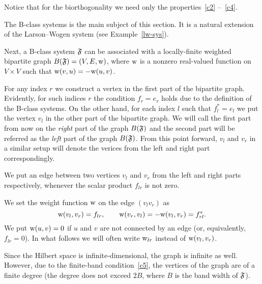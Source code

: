 \documentclass[12pt,oneside,a4paper]{amsart}
\begin{document}
    \begin{remark}
      Notice that for the biorthogonality we need only the properties~\ref{c2} --~\ref{c4}.
    \end{remark}
    The B-class systems is the main subject of this section.
    It is a natural extension of the Larson--Wogen system (see Example~\ref{lw-sys}).

    Next, a B-class system $\mathfrak{F}$ can be associated with a
      locally-finite weighted bipartite graph $B(\mathfrak{F}) = (V, E, \mathrm{w})$, where $\mathrm{w}$ is a
      nonzero real-valued function on $V\times V$ such that $\mathrm{w}(v, u) = -\mathrm{w}(u, v)$.

    For any index $r$ we construct a vertex in the first part of the bipartite graph.
    Evidently, for such indices $r$ the condition $f_r = e_r$ holds due to the definition of the B-class systems.
    On the other hand, for each index $l$ such that $f^*_l = e_l$ we put the vertex $v_l$ in the other part of the bipartite graph.
    We will call the first part from now on the \emph{right} part of the graph $B(\mathfrak{F})$ and the second part
      will be referred as the \emph{left} part of the graph $B(\mathfrak{F})$.
    From this point forward, $v_l$ and $v_r$ in a similar setup will denote the verices from the left and right part correspondingly.

    We put an edge between two vertices $v_l$ and $v_r$ from the left and right parts respectively,
      whenever the scalar product $f_{lr}$ is not zero.

    We set the weight function $\mathrm{w}$ on the edge $(v_l v_r)$ as
    \begin{equation}
      \label{def-wt}
      \mathrm{w}(v_l, v_r) = f_{lr}, \qquad \mathrm{w}(v_r, v_l) = -\mathrm{w}(v_l, v_r) = f_{rl}^*.
    \end{equation}
    We put $\mathrm{w}(u, v) = 0$ if $u$ and $v$ are not connected by an edge (or, equivalently, $f_{lr} = 0$).
    In what follows we will often write $\mathrm{w}_{lr}$ instead of $\mathrm{w}(v_l, v_r)$.

    Since the Hilbert space is infinite-dimensional, the graph is infinite as well.
    However, due to the finite-band condition~\ref{c5}, the vertices of the graph are of a finite degree (the degree does not
      exceed $2B$, where $B$ is the band width of $\mathfrak{F}$).
\end{document}
